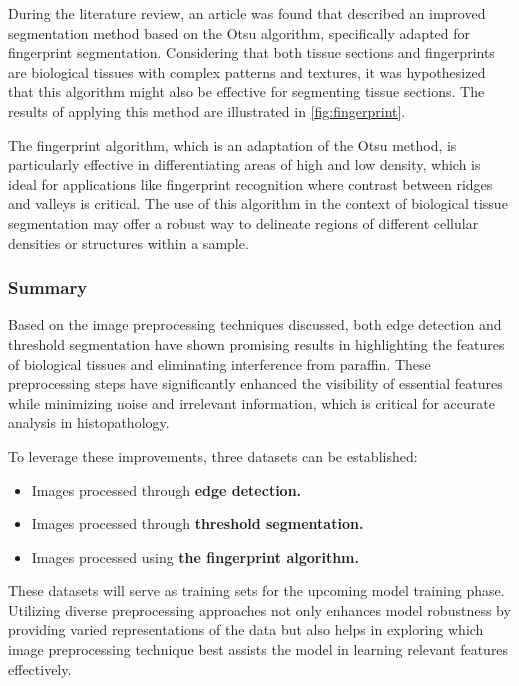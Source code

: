During the literature review, an article was found that described an improved segmentation method based on the Otsu algorithm, specifically adapted for fingerprint segmentation. Considering that both tissue sections and fingerprints are biological tissues with complex patterns and textures, it was hypothesized that this algorithm might also be effective for segmenting tissue sections. The results of applying this method are illustrated in \autoref{fig:fingerprint}.

The fingerprint algorithm, which is an adaptation of the Otsu method, is particularly effective in differentiating areas of high and low density, which is ideal for applications like fingerprint recognition where contrast between ridges and valleys is critical. The use of this algorithm in the context of biological tissue segmentation may offer a robust way to delineate regions of different cellular densities or structures within a sample.

\subsubsection{Summary}

Based on the image preprocessing techniques discussed, both edge detection and threshold segmentation have shown promising results in highlighting the features of biological tissues and eliminating interference from paraffin. These preprocessing steps have significantly enhanced the visibility of essential features while minimizing noise and irrelevant information, which is critical for accurate analysis in histopathology.

To leverage these improvements, three datasets can be established:

\begin{itemize}
    \item Images processed through \textbf{edge detection.}
    \item Images processed through \textbf{threshold segmentation.}
    \item Images processed using \textbf{the fingerprint algorithm.}
\end{itemize}

These datasets will serve as training sets for the upcoming model training phase. Utilizing diverse preprocessing approaches not only enhances model robustness by providing varied representations of the data but also helps in exploring which image preprocessing technique best assists the model in learning relevant features effectively.

